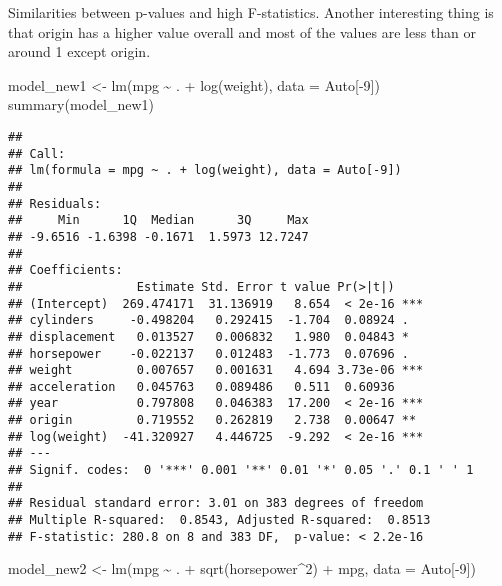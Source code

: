 \documentclass[
]{article}
\newenvironment{Shaded}{\begin{snugshade}}{\end{snugshade}}
\newcommand{\AttributeTok}[1]{\textcolor[rgb]{0.77,0.63,0.00}{#1}}
\newcommand{\DecValTok}[1]{\textcolor[rgb]{0.00,0.00,0.81}{#1}}
\newcommand{\FunctionTok}[1]{\textcolor[rgb]{0.00,0.00,0.00}{#1}}
\newcommand{\NormalTok}[1]{#1}
\newcommand{\OtherTok}[1]{\textcolor[rgb]{0.56,0.35,0.01}{#1}}
\newcommand{\SpecialCharTok}[1]{\textcolor[rgb]{0.00,0.00,0.00}{#1}}
\begin{document}
Similarities between p-values and high F-statistics. Another interesting
thing is that origin has a higher value overall and most of the values
are less than or around 1 except origin.

\begin{Shaded}
\begin{Highlighting}[]
\NormalTok{model\_new1 }\OtherTok{\textless{}{-}} \FunctionTok{lm}\NormalTok{(mpg }\SpecialCharTok{\textasciitilde{}}\NormalTok{ . }\SpecialCharTok{+} \FunctionTok{log}\NormalTok{(weight), }\AttributeTok{data =}\NormalTok{ Auto[}\SpecialCharTok{{-}}\DecValTok{9}\NormalTok{])}
\FunctionTok{summary}\NormalTok{(model\_new1)}
\end{Highlighting}
\end{Shaded}

\begin{verbatim}
## 
## Call:
## lm(formula = mpg ~ . + log(weight), data = Auto[-9])
## 
## Residuals:
##     Min      1Q  Median      3Q     Max 
## -9.6516 -1.6398 -0.1671  1.5973 12.7247 
## 
## Coefficients:
##                Estimate Std. Error t value Pr(>|t|)    
## (Intercept)  269.474171  31.136919   8.654  < 2e-16 ***
## cylinders     -0.498204   0.292415  -1.704  0.08924 .  
## displacement   0.013527   0.006832   1.980  0.04843 *  
## horsepower    -0.022137   0.012483  -1.773  0.07696 .  
## weight         0.007657   0.001631   4.694 3.73e-06 ***
## acceleration   0.045763   0.089486   0.511  0.60936    
## year           0.797808   0.046383  17.200  < 2e-16 ***
## origin         0.719552   0.262819   2.738  0.00647 ** 
## log(weight)  -41.320927   4.446725  -9.292  < 2e-16 ***
## ---
## Signif. codes:  0 '***' 0.001 '**' 0.01 '*' 0.05 '.' 0.1 ' ' 1
## 
## Residual standard error: 3.01 on 383 degrees of freedom
## Multiple R-squared:  0.8543, Adjusted R-squared:  0.8513 
## F-statistic: 280.8 on 8 and 383 DF,  p-value: < 2.2e-16
\end{verbatim}

\begin{Shaded}
\begin{Highlighting}[]
\NormalTok{model\_new2 }\OtherTok{\textless{}{-}} \FunctionTok{lm}\NormalTok{(mpg }\SpecialCharTok{\textasciitilde{}}\NormalTok{ . }\SpecialCharTok{+} \FunctionTok{sqrt}\NormalTok{(horsepower}\SpecialCharTok{\^{}}\DecValTok{2}\NormalTok{) }\SpecialCharTok{+}\NormalTok{ mpg, }\AttributeTok{data =}\NormalTok{ Auto[}\SpecialCharTok{{-}}\DecValTok{9}\NormalTok{])}
\end{Highlighting}
\end{Shaded}
\end{document}
